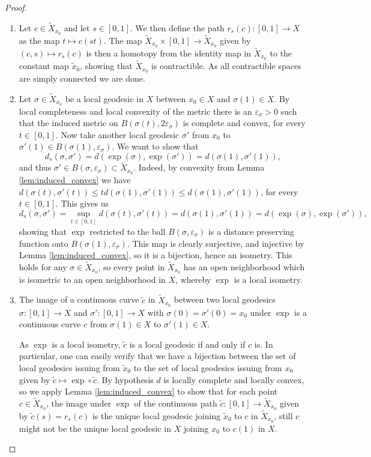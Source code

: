 \documentclass[11pt, a4paper, oneside]{memoir}
\theoremstyle{plain}\newtheorem{theorem}[subsection]{Theorem}
\theoremstyle{definition}
\newcommand{\parenum}{\setenumerate[1]{label=\textbf{(\arabic*)}}}
\newcommand{\twiddle}[1]{\widetilde{#1}}
\begin{document}
\begin{proof}
\parenum
\begin{enumerate}
    \item Let \(c\in\twiddle{X}_{x_0}\) and let \(s\in[0,1]\).
We then define the path \(r_s(c):[0,1]\to X\) as the map \(t\mapsto c(st)\).
The map \(\twiddle{X}_{x_0}\times [0,1]\to \twiddle{X}_{x_0}\) given by \((c,s)\mapsto r_s(c)\) is then a homotopy from the identity map in \(\twiddle{X}_{x_0}\) to the constant map \(\twiddle{x}_0\), showing that \(\twiddle{X}_{x_0}\) is contractible.
As all contractible spaces are simply connected we are done.
    \item Let \(\sigma\in\twiddle{X}_{x_0}\) be a local geodesic in \(X\) between \(x_0\in X\) and \(\sigma(1)\in X\).
By local completeness and local convexity of the metric there is an \(\varepsilon_\sigma>0\) such that the induced metric on \(B(\sigma(t), 2\varepsilon_\sigma)\) is complete and convex,  for every $t \in [0,1]$.
Now take another local geodesic \(\sigma'\) from \(x_0\) to \(\sigma'(1) \in B(\sigma(1),\varepsilon_\sigma)\).
We want to show that $$d_s(\sigma,\sigma')=d(\exp(\sigma),\exp(\sigma'))=d(\sigma(1),\sigma'(1)),$$ and thus  \( \sigma' \in B(\sigma,\varepsilon_\sigma) \subset \twiddle{X}_{x_0}\).
Indeed, by convexity from Lemma \ref{lem:induced_convex} we have \(d(\sigma(t),\sigma'(t))\leq t d(\sigma(1),\sigma'(1)) \leq d(\sigma(1),\sigma'(1))\), for every $t \in [0,1]$.
This gives us
\[d_s(\sigma,\sigma')=\sup_{t\in [0,1]} d(\sigma(t),\sigma'(t))=d(\sigma(1),\sigma'(1))=d(\exp(\sigma),\exp(\sigma')),\]
showing that $\exp$ restricted to the ball \(B(\sigma,\varepsilon_\sigma)\) is a distance preserving function onto \(B(\sigma(1),\varepsilon_\sigma)\). 
This map is clearly surjective, and injective by Lemma \ref{lem:induced_convex}, so it is a bijection, hence an isometry.
This holds for any \(\sigma\in \twiddle{X}_{x_0}\), so every point in \(\twiddle{X}_{x_0}\) has an open neighborhood which is isometric to an open neighborhood in \(X\), whereby $\exp$ is a local isometry.
    \item The image of a continuous curve \(\twiddle{c}\) in \(\twiddle{X}_{x_0}\) between two local geodesics \(\sigma:[0,1]\to X\) and \(\sigma':[0,1]\to X\) with \(\sigma(0)=\sigma'(0)=x_0\) under \(\exp\) is a continuous curve \(c\) from \(\sigma(1)\in X\) to \(\sigma'(1)\in X\).
    
As \(\exp\) is a local isometry, \(\twiddle{c}\) is a local geodesic if and only if \(c\) is. In particular, one can easily verify that we have a bijection between the set of local geodesics issuing from \(\twiddle{x}_0\) to the set of local geodesics issuing from \(x_0\) given by \(\twiddle{c}\mapsto\exp\circ\twiddle{c}\).
By hypothesis \(d\) is locally complete and locally convex, so we apply Lemma \ref{lem:induced_convex} to show that for each point \(c\in\twiddle{X}_{x_0}\), the image under \(\exp\) of the continuous path \(\twiddle{c}:[0,1]\to \twiddle{X}_{x_0}\) given by \(\twiddle{c}(s)=r_s(c)\) is the unique local geodesic joining \(\twiddle{x}_0\) to \(c\) in \(\twiddle{X}_{x_0}\),  still $c$ might not be the unique local geodesic in $X$ joining \(x_0\) to \(c(1)\) in \(X\).
\end{enumerate}
\end{proof} 
\end{document}
